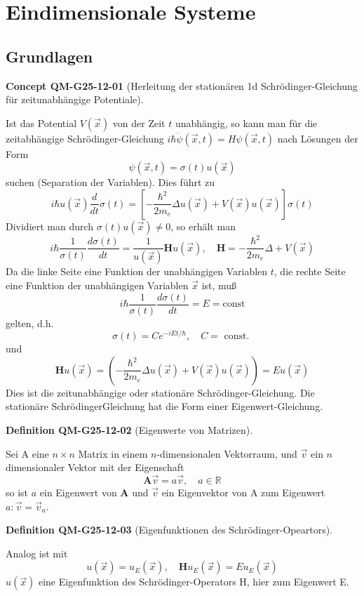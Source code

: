 \documentclass[10pt, letterpaper]{article}
\newcommand{\CustomHeading}[3]{%
  \par\medskip\noindent%
  \textbf{#1 #2} \textnormal{(#3)}.\enskip%
}
\newenvironment{DEF}[2]{\CustomHeading{Definition}{#1}{#2}}{}
\newenvironment{CONC}[2]{\CustomHeading{Concept}{#1}{#2}}{}
\begin{document}
\section{Eindimensionale Systeme}

\subsection{Grundlagen}

\begin{CONC}{QM-G25-12-01}{Herleitung der stationären 1d Schrödinger-Gleichung für zeitunabhängige Potentiale}
Ist das Potential $V(\vec{x})$ von der Zeit $t$ unabhängig, so kann man für die zeitabhängige Schrödinger-Gleichung $i \hbar \dot{\psi}(\vec{x}, t)=H \psi(\vec{x}, t)$ nach Lösungen der Form
$$
\psi(\vec{x}, t)=\sigma(t) u(\vec{x})
$$
suchen (Separation der Variablen). Dies führt zu
$$
i \hbar u(\vec{x}) \frac{d}{d t} \sigma(t)=\left[-\frac{\hbar^{2}}{2 m_{e}} \Delta u(\vec{x})+V(\vec{x}) u(\vec{x})\right] \sigma(t)
$$
Dividiert man durch $\sigma(t) u(\vec{x}) \neq 0$, so erhält man
$$
i \hbar \frac{1}{\sigma(t)} \frac{d \sigma(t)}{d t}=\frac{1}{u(\vec{x})} \mathbf{H} u(\vec{x}), \quad \mathbf{H}=-\frac{\hbar^{2}}{2 m_{e}} \Delta+V(\vec{x})
$$
Da die linke Seite eine Funktion der unabhängigen Variablen $t$, die rechte Seite eine Funktion der unabhängigen Variablen $\vec{x}$ ist, muß
$$
i \hbar \frac{1}{\sigma(t)} \frac{d \sigma(t)}{d t}=E=\mathrm{const}
$$
gelten, d.h.
$$
\sigma(t)=C e^{-i E t / \hbar}, \quad C=\text { const. }
$$
und
$$
\mathbf{H} u(\vec{x})=\left(-\frac{\hbar^{2}}{2 m_{e}} \Delta u(\vec{x})+V(\vec{x}) u(\vec{x})\right)=E u(\vec{x})
$$
Dies ist die zeitunabhängige oder stationäre Schrödinger-Gleichung. Die stationäre SchrödingerGleichung hat die Form einer Eigenwert-Gleichung.
\end{CONC}

\begin{DEF}{QM-G25-12-02}{Eigenwerte von Matrizen}
Sei A eine $n \times n$ Matrix in einem $n$-dimensionalen Vektorraum, und $\vec{v}$ ein $n$ dimensionaler Vektor mit der Eigenschaft
$$
\mathbf{A} \vec{v}=a \vec{v}, \quad a \in \mathbb{R}
$$
so ist $a$ ein Eigenwert von $\mathbf{A}$ und $\vec{v}$ ein Eigenvektor von A zum Eigenwert $a: \vec{v}=\vec{v}_{a}$.
\end{DEF}

\begin{DEF}{QM-G25-12-03}{Eigenfunktionen des Schrödinger-Opeartors}
Analog ist mit
$$
u(\vec{x})=u_{E}(\vec{x}), \quad \mathbf{H} u_{E}(\vec{x})=E u_{E}(\vec{x})
$$
$u(\vec{x})$ eine Eigenfunktion des Schrödinger-Operators H, hier zum Eigenwert E.
\end{DEF}
\end{document}
